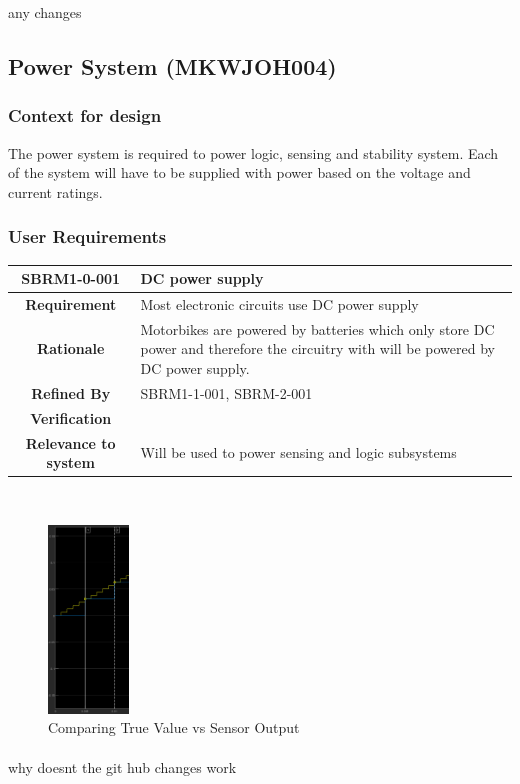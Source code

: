 \documentclass{article}
\begin{document}
any changes
\subsection{Power System (MKWJOH004)}
\label{sec:PowerSystem}
    \subsubsection{Context for design}
    The power system is required to power logic, sensing and stability system. Each of the system will have to be supplied with power based on the voltage and current ratings.
     \subsubsection{User Requirements}
\begin{tabular}{|c|p{7.2cm}|}
 \hline
 \textbf{SBRM1-0-001} &\textbf{DC power supply}  \\ 
 \hline
 \textbf{Requirement} & Most electronic circuits use DC power supply\\
 \hline
 \textbf{Rationale} & Motorbikes are powered by batteries which only store DC power and therefore the circuitry with will be powered by DC power supply. \\
 \hline
 \textbf{Refined By} & SBRM1-1-001, SBRM-2-001\\%
 \hline
 \textbf{Verification} & \\
 \hline
 \textbf{Relevance to system} & Will be used to power sensing and logic subsystems\\
 \hline
\end{tabular}\\[0.5cm]


\begin{figure}[ht]
        \centering
        \includegraphics[height = 50mm]{pic/acc_zoom.PNG}
        \caption{Comparing True Value vs Sensor Output}
\end{figure}

\paragraph{}
why doesnt the git hub changes work
\end{document}
